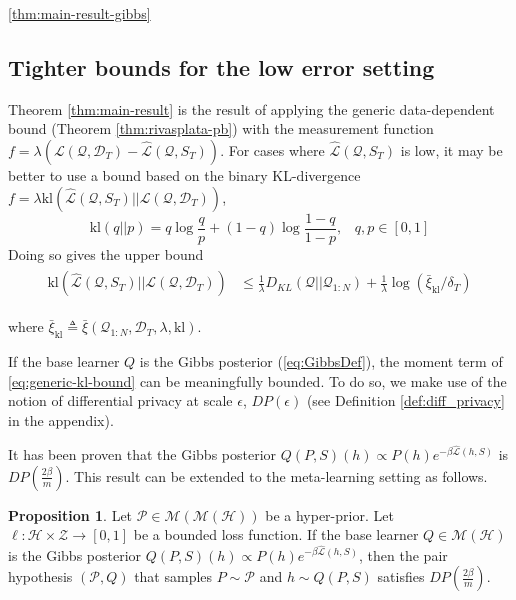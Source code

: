 \documentclass{article} %
\theoremstyle{definition}
\newtheorem{proposition}[theorem]{Proposition}
\begin{document}
 \ref{thm:main-result-gibbs} 

\subsection{Tighter bounds for the low error setting}

Theorem \ref{thm:main-result} is the result of applying the generic data-dependent bound (Theorem \ref{thm:rivasplata-pb}) with the measurement function $f=\lambda(\mathcal{L}(\mathcal{Q},\mathcal{D}_T)-\hat{\mathcal{L}}(\mathcal{Q}, S_T))$. For cases where $\hat{\mathcal{L}}(\mathcal{Q}, S_T)$ is low, it may be better to use a bound based on the binary KL-divergence $f=\lambda \mathrm{kl}(\hat{\mathcal{L}}(\mathcal{Q}, S_T)||\mathcal{L}(\mathcal{Q},\mathcal{D}_T))$, 
$$
\mathrm{kl}(q||p)=q \log\frac{q}{p}+(1-q)\log\frac{1-q}{1-p},\;\;\; q,p\in[0, 1]
$$
Doing so gives the upper bound
    \begin{align} \label{eq:generic-kl-bound}
\begin{split}
\mathrm{kl}(\hat{\mathcal{L}}(\mathcal{Q}, S_T)||\mathcal{L}(\mathcal{Q},\mathcal{D}_T)) &\leq \frac{1}{\lambda} D_{KL}(\mathcal{Q}||\mathcal{Q}_{1:N})
+\frac{1}{\lambda}\log\left (\bar{\xi}_{\mathrm{kl}}/\delta_T\right ) 
\end{split}
\end{align}

where $\bar{\xi}_{\mathrm{kl}}\triangleq \bar{\xi}(\mathcal{Q}_{1:N}, \mathcal{D}_T,\lambda, \mathrm{kl}) .$

If the base learner $Q$ is the Gibbs posterior (\eqref{eq:GibbsDef}), the moment term of  \eqref{eq:generic-kl-bound} can be meaningfully bounded. To do so, we make use of the notion of differential privacy at scale $\epsilon$, $DP(\epsilon)$ (see Definition \ref{def:diff_privacy} in the appendix).

It has been proven \citep{McSherry2007, Rivasplata2020} that the Gibbs posterior $Q(P, S)(h)\propto P(h)e^{-\beta\hat{\mathcal{L}}(h, S)}$ is $DP\left (\frac{2\beta}{m}\right )$.
This result can be extended to the meta-learning setting as follows. 
%
\begin{proposition} \label{thm:pair-is-dp}
	Let $\mathcal{P}\in \mathcal{M}(\mathcal{M}(\mathcal{H}))$ be a hyper-prior.
	Let $\ell:\mathcal{H}\times \mathcal{Z}\rightarrow [0,1]$ be a bounded loss function. If the base learner $Q\in \mathcal{M}(\mathcal{H})$ is the Gibbs posterior $Q(P, S)(h)\propto P(h)e^{-\beta\hat{\mathcal{L}}(h, S)}$, 
	then the pair hypothesis $(\mathcal{P}, Q)$ that samples $P\sim\mathcal{P}$ and $h\sim Q(P, S)$ satisfies $DP\left (\frac{2\beta}{m}\right )$.
\end{proposition}
\end{document}
